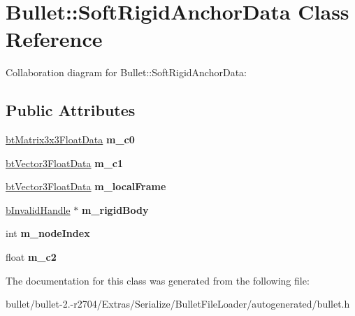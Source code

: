 \hypertarget{class_bullet_1_1_soft_rigid_anchor_data}{\section{Bullet\+:\+:Soft\+Rigid\+Anchor\+Data Class Reference}
\label{class_bullet_1_1_soft_rigid_anchor_data}
}


Collaboration diagram for Bullet\+:\+:Soft\+Rigid\+Anchor\+Data\+:
\subsection*{Public Attributes}
\begin{DoxyCompactItemize}
\item 
\hypertarget{class_bullet_1_1_soft_rigid_anchor_data_a941ec229d4cdc43642503d332705fffe}{\hyperlink{class_bullet_1_1bt_matrix3x3_float_data}{bt\+Matrix3x3\+Float\+Data} {\bfseries m\+\_\+c0}}\label{class_bullet_1_1_soft_rigid_anchor_data_a941ec229d4cdc43642503d332705fffe}

\item 
\hypertarget{class_bullet_1_1_soft_rigid_anchor_data_aeb65f597371a392110008787e3055cf2}{\hyperlink{class_bullet_1_1bt_vector3_float_data}{bt\+Vector3\+Float\+Data} {\bfseries m\+\_\+c1}}\label{class_bullet_1_1_soft_rigid_anchor_data_aeb65f597371a392110008787e3055cf2}

\item 
\hypertarget{class_bullet_1_1_soft_rigid_anchor_data_a543f6fe953aa98db9741dbf0af842dbe}{\hyperlink{class_bullet_1_1bt_vector3_float_data}{bt\+Vector3\+Float\+Data} {\bfseries m\+\_\+local\+Frame}}\label{class_bullet_1_1_soft_rigid_anchor_data_a543f6fe953aa98db9741dbf0af842dbe}

\item 
\hypertarget{class_bullet_1_1_soft_rigid_anchor_data_a428a36f73b63840e328cbbdb6312e6b4}{\hyperlink{struct_bullet_1_1b_invalid_handle}{b\+Invalid\+Handle} $\ast$ {\bfseries m\+\_\+rigid\+Body}}\label{class_bullet_1_1_soft_rigid_anchor_data_a428a36f73b63840e328cbbdb6312e6b4}

\item 
\hypertarget{class_bullet_1_1_soft_rigid_anchor_data_aa83bc75dd8b26d9d819dfa99953bbb49}{int {\bfseries m\+\_\+node\+Index}}\label{class_bullet_1_1_soft_rigid_anchor_data_aa83bc75dd8b26d9d819dfa99953bbb49}

\item 
\hypertarget{class_bullet_1_1_soft_rigid_anchor_data_a48154cfcf0f6b2b809c048fa12725b7e}{float {\bfseries m\+\_\+c2}}\label{class_bullet_1_1_soft_rigid_anchor_data_a48154cfcf0f6b2b809c048fa12725b7e}

\end{DoxyCompactItemize}


The documentation for this class was generated from the following file\+:\begin{DoxyCompactItemize}
\item 
bullet/bullet-\/2.-\/r2704/\+Extras/\+Serialize/\+Bullet\+File\+Loader/autogenerated/bullet.\+h\end{DoxyCompactItemize}
